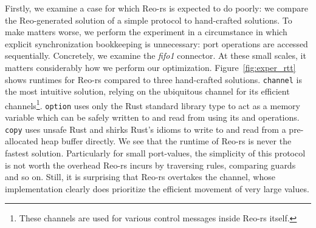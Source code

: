 Firstly, we examine a case for which Reo-rs is expected to do poorly: we compare the Reo-generated solution of a simple protocol to hand-crafted solutions. To make matters worse, we perform the experiment in a circumstance in which explicit synchronization bookkeeping is unnecessary: port operations are accessed sequentially.
Concretely, we examine the \textit{fifo1} connector. At these small scales, it matters considerably how we perform our optimization. Figure~\ref{fig:exper_rtt} shows runtimes for Reo-rs compared to three hand-crafted solutions. \texttt{channel} is the most intuitive solution, relying on the ubiquitous  channel for its efficient channels\footnote{These channels are used for various control messages inside Reo-rs itself.}. \texttt{option} uses only the Rust standard library type  to act as a memory variable which can be safely written to and read from using its  and  operations. \texttt{copy} uses unsafe Rust and shirks Rust's idioms to write to and read from a pre-allocated heap buffer directly. We see that the runtime of Reo-rs is never the fastest solution. Particularly for small port-values, the simplicity of this protocol is not worth the overhead Reo-rs incurs by traversing rules, comparing guards and so on. Still, it is surprising that Reo-rs overtakes the  channel, whose implementation clearly does prioritize the efficient movement of very large values.

